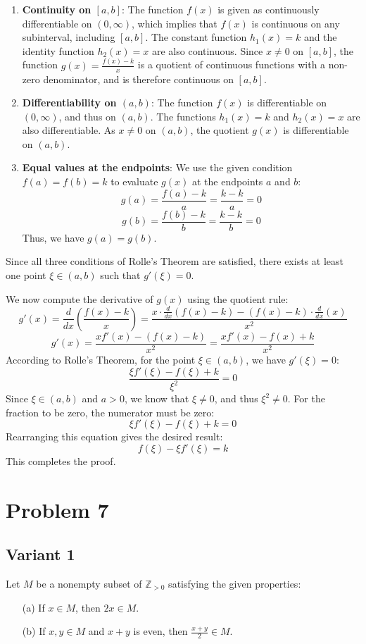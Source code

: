 \documentclass[12pt,a4paper]{article}
\theoremstyle{definition}
\begin{document}
    \begin{enumerate}
        \item \textbf{Continuity on $[a,b]$}: The function $f(x)$ is given as continuously differentiable on $(0, \infty)$, which implies that $f(x)$ is continuous on any subinterval, including $[a,b]$. The constant function $h_1(x)=k$ and the identity function $h_2(x)=x$ are also continuous. Since $x \neq 0$ on $[a,b]$, the function $g(x) = \frac{f(x)-k}{x}$ is a quotient of continuous functions with a non-zero denominator, and is therefore continuous on $[a,b]$.

        \item \textbf{Differentiability on $(a,b)$}: The function $f(x)$ is differentiable on $(0, \infty)$, and thus on $(a,b)$. The functions $h_1(x)=k$ and $h_2(x)=x$ are also differentiable. As $x \neq 0$ on $(a,b)$, the quotient $g(x)$ is differentiable on $(a,b)$.

        \item \textbf{Equal values at the endpoints}: We use the given condition $f(a) = f(b) = k$ to evaluate $g(x)$ at the endpoints $a$ and $b$:
        $$g(a) = \frac{f(a) - k}{a} = \frac{k - k}{a} = 0$$
        $$g(b) = \frac{f(b) - k}{b} = \frac{k - k}{b} = 0$$
        Thus, we have $g(a) = g(b)$.
    \end{enumerate}

    Since all three conditions of Rolle's Theorem are satisfied, there exists at least one point $\xi \in (a,b)$ such that $g'(\xi) = 0$.

    We now compute the derivative of $g(x)$ using the quotient rule:
    $$g'(x) = \frac{d}{dx}\left(\frac{f(x)-k}{x}\right) = \frac{x \cdot \frac{d}{dx}(f(x)-k) - (f(x)-k) \cdot \frac{d}{dx}(x)}{x^2}$$
    $$g'(x) = \frac{x f'(x) - (f(x)-k)}{x^2} = \frac{x f'(x) - f(x) + k}{x^2}$$
    According to Rolle's Theorem, for the point $\xi \in (a,b)$, we have $g'(\xi) = 0$:
    $$\frac{\xi f'(\xi) - f(\xi) + k}{\xi^2} = 0$$
    Since $\xi \in (a,b)$ and $a>0$, we know that $\xi \neq 0$, and thus $\xi^2 \neq 0$. For the fraction to be zero, the numerator must be zero:
    $$\xi f'(\xi) - f(\xi) + k = 0$$
    Rearranging this equation gives the desired result:
    $$f(\xi) - \xi f'(\xi) = k$$
    This completes the proof.

\section{Problem 7}
\subsection{Variant 1}
        Let $M$ be a nonempty subset of $\mathbb{Z}_{>0}$ satisfying the given properties:
        \begin{enumerate}
            \item[(a)] If $x \in M$, then $2x \in M$.
            \item[(b)] If $x,y \in M$ and $x + y$ is even, then $\frac{x + y}{2} \in M$.
        \end{enumerate}
\end{document}
